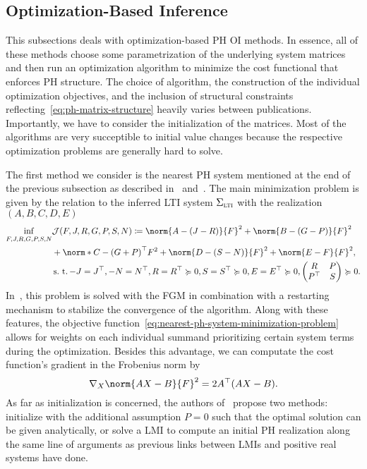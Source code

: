 \subsection{Optimization-Based Inference}\label{subsec:optimization-based-inference}

This subsections deals with optimization-based \ac{PH} \ac{OI} methods.
In essence, all of these methods choose some parametrization of the underlying system matrices and then run an optimization algorithm to minimize the cost functional that enforces \ac{PH} structure.
The choice of algorithm, the construction of the individual optimization objectives, and the inclusion of structural constraints reflecting~\eqref{eq:ph-matrix-structure} heavily varies between publications.
Importantly, we have to consider the initialization of the matrices.
Most of the algorithms are very succeptible to initial value changes because the respective optimization problems are generally hard to solve.

The first method we consider is the nearest \ac{PH} system mentioned at the end of the previous subsection as described in~\cite{Gillis2018} and~\cite{Cherifi2019}.
The main minimization problem is given by the relation to the inferred \ac{LTI} system $\Sigma_{\textnormal{\scshape lti}}$ with the realization $(A, B, C, D, E)$
\begin{equation}\label{eq:nearest-ph-system-minimization-problem}
    \begin{alignedat}{4}
        \eqinf\limits_{F, J, R, G, P, S, N} &\mcl{J}(F, J, R, G, P, S, N) \coloneqq \norm{A - (J - R)}{F}^2 + \norm{B - (G - P)}{F}^2 \\
        &+ \norm*{C - {(G + P)}\trans}{F}^2 + \norm{D - (S - N)}{F}^2 + \norm{E - F}{F}^2, \\
        &\suchthat -J = J\trans, -N = N\trans, R = R\trans \succcurlyeq 0, S = S\trans \succcurlyeq 0, E = E\trans \succcurlyeq 0, \begin{pmatrix}
            R & P \\
            P\trans & S
        \end{pmatrix} \succcurlyeq 0.
    \end{alignedat}
\end{equation}
In~\cite{Gillis2018}, this problem is solved with the \ac{FGM} in combination with a restarting mechanism to stabilize the convergence of the algorithm.
Along with these features, the objective function~\eqref{eq:nearest-ph-system-minimization-problem} allows for weights on each individual summand prioritizing certain system terms during the optimization.
Besides this advantage, we can computate the cost function's gradient in the Frobenius norm by
\begin{equation*}
    \nabla_X \norm{A X - B}{F}^2 = 2 A\trans (A X - B).
\end{equation*}
As far as initialization is concerned, the authors of~\cite{Gillis2018} propose two methods: initialize with the additional assumption $P = 0$ such that the optimal solution can be given analytically, or solve a \ac{LMI} to compute an initial \ac{PH} realization along the same line of arguments as previous links between \acp{LMI} and positive real systems have done.

